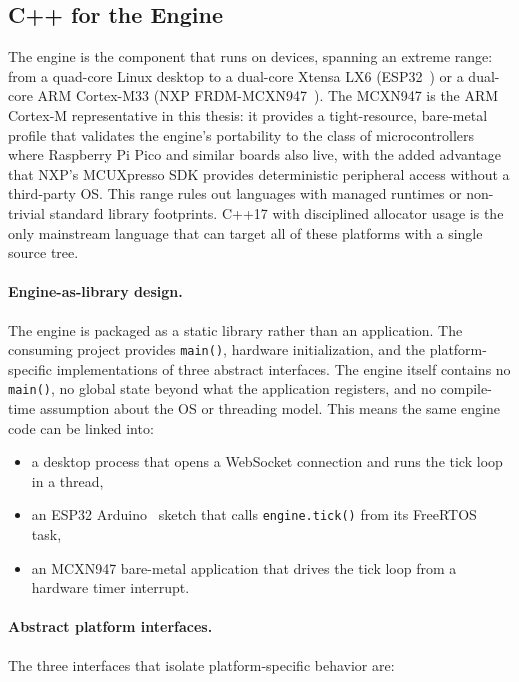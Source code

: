 \subsection{C++ for the Engine}

The engine is the component that runs on devices, spanning an extreme range: from a quad-core Linux desktop to a dual-core Xtensa LX6 (ESP32~\cite{ESP32TRM}) or a dual-core ARM Cortex-M33 (NXP FRDM-MCXN947~\cite{NXPFRDMMCXN947}). The MCXN947 is the ARM Cortex-M representative in this thesis: it provides a tight-resource, bare-metal profile that validates the engine's portability to the class of microcontrollers where Raspberry Pi Pico and similar boards also live, with the added advantage that NXP's MCUXpresso SDK provides deterministic peripheral access without a third-party OS. This range rules out languages with managed runtimes or non-trivial standard library footprints. C++17 with disciplined allocator usage is the only mainstream language that can target all of these platforms with a single source tree.

\paragraph{Engine-as-library design.}
The engine is packaged as a static library rather than an application. The consuming project provides \texttt{main()}, hardware initialization, and the platform-specific implementations of three abstract interfaces. The engine itself contains no \texttt{main()}, no global state beyond what the application registers, and no compile-time assumption about the OS or threading model. This means the same engine code can be linked into:

\begin{itemize}
  \item a desktop process that opens a WebSocket connection and runs the tick loop in a thread,
  \item an ESP32 Arduino~\cite{Arduino} sketch that calls \texttt{engine.tick()} from its FreeRTOS~\cite{FreeRTOS} task,
  \item an MCXN947 bare-metal application that drives the tick loop from a hardware timer interrupt.
\end{itemize}

\paragraph{Abstract platform interfaces.}
The three interfaces that isolate platform-specific behavior are:

